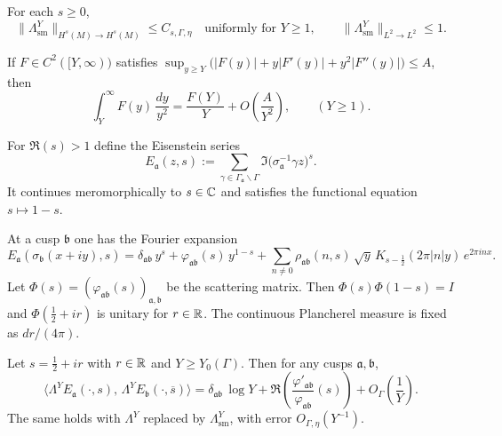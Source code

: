 \begin{lemma}\label{lem:smooth-trunc-sobolev}
For each $s\ge 0$,
\[
\|\Lambda^{Y}_{\mathrm{sm}}\|_{H^{s}(M)\to H^{s}(M)}\le C_{s,\Gamma,\eta}
\quad\text{uniformly for }Y\ge 1,
\qquad
\|\Lambda^{Y}_{\mathrm{sm}}\|_{L^{2}\to L^{2}}\le 1.
\]
\end{lemma}

\begin{remark}\label{rem:tail-extraction}
If $F\in C^{2}([Y,\infty))$ satisfies
$\sup_{y\ge Y}\bigl(|F(y)|+y|F'(y)|+y^{2}|F''(y)|\bigr)\le A$,
then
\[
\int_{Y}^{\infty} F(y)\,\frac{dy}{y^{2}}
=
\frac{F(Y)}{Y}
+
O\!\left(\frac{A}{Y^{2}}\right),
\qquad (Y\ge 1).
\]
\end{remark}

For $\Re(s)>1$ define the Eisenstein series
\begin{equation}\label{eq:eisenstein-def}
E_{\mathfrak a}(z,s):=
\sum_{\gamma\in \Gamma_{\mathfrak a}\backslash \Gamma}
\Im\!\bigl(\sigma_{\mathfrak a}^{-1}\gamma z\bigr)^{s}.
\end{equation}
It continues meromorphically to $s\in\mathbb{C}$ and satisfies the functional equation $s\mapsto 1-s$.

At a cusp $\mathfrak b$ one has the Fourier expansion
\begin{equation}\label{eq:eis-fourier}
E_{\mathfrak a}(\sigma_{\mathfrak b}(x+iy),s)
=
\delta_{\mathfrak a\mathfrak b}\,y^{s}
+
\varphi_{\mathfrak a\mathfrak b}(s)\,y^{1-s}
+
\sum_{n\neq 0}\rho_{\mathfrak a\mathfrak b}(n,s)\,
\sqrt{y}\,K_{s-\frac12}(2\pi|n|y)\,e^{2\pi i n x}.
\end{equation}
Let $\Phi(s)=(\varphi_{\mathfrak a\mathfrak b}(s))_{\mathfrak a,\mathfrak b}$ be the scattering matrix.
Then $\Phi(s)\Phi(1-s)=I$ and $\Phi(\tfrac12+ir)$ is unitary for $r\in\mathbb{R}$.
The continuous Plancherel measure is fixed as $dr/(4\pi)$.

\begin{theorem}\label{thm:maass-selberg}
Let $s=\tfrac12+ir$ with $r\in\mathbb{R}$ and $Y\ge Y_0(\Gamma)$.
Then for any cusps $\mathfrak a,\mathfrak b$,
\begin{equation}\label{eq:maass-selberg}
\Big\langle \Lambda^{Y}E_{\mathfrak a}(\cdot,s),\,\Lambda^{Y}E_{\mathfrak b}(\cdot,\overline{s})\Big\rangle
=
\delta_{\mathfrak a\mathfrak b}\,\log Y
+
\Re\!\left(\frac{\varphi'_{\mathfrak a\mathfrak b}}{\varphi_{\mathfrak a\mathfrak b}}(s)\right)
+
O_{\Gamma}\!\left(\frac{1}{Y}\right).
\end{equation}
The same holds with $\Lambda^{Y}$ replaced by $\Lambda^{Y}_{\mathrm{sm}}$, with error $O_{\Gamma,\eta}(Y^{-1})$.
\end{theorem}


